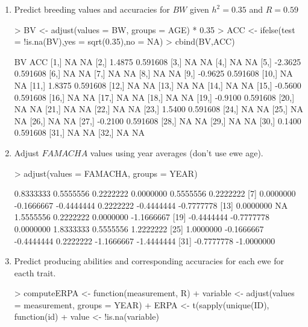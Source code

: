 \documentclass[12pt,a4paper]{paper}
\begin{document}
\begin{enumerate}
\item Predict breeding values and accuracies for $BW$ given $h^{2} = 0.35$ and $R = 0.59$
\begin{Schunk}
\begin{Sinput}
> BV <- adjust(values = BW, groups = AGE) * 0.35
> ACC <- ifelse(test = !is.na(BV),yes = sqrt(0.35),no = NA)
> cbind(BV,ACC)
\end{Sinput}
\begin{Soutput}
           BV      ACC
 [1,]      NA       NA
 [2,]  1.4875 0.591608
 [3,]      NA       NA
 [4,]      NA       NA
 [5,] -2.3625 0.591608
 [6,]      NA       NA
 [7,]      NA       NA
 [8,]      NA       NA
 [9,] -0.9625 0.591608
[10,]      NA       NA
[11,]  1.8375 0.591608
[12,]      NA       NA
[13,]      NA       NA
[14,]      NA       NA
[15,] -0.5600 0.591608
[16,]      NA       NA
[17,]      NA       NA
[18,]      NA       NA
[19,] -0.9100 0.591608
[20,]      NA       NA
[21,]      NA       NA
[22,]      NA       NA
[23,]  1.5400 0.591608
[24,]      NA       NA
[25,]      NA       NA
[26,]      NA       NA
[27,] -0.2100 0.591608
[28,]      NA       NA
[29,]      NA       NA
[30,]  0.1400 0.591608
[31,]      NA       NA
[32,]      NA       NA
\end{Soutput}
\end{Schunk}
\item Adjust $FAMACHA$ values using year averages (don't use ewe age). 
\begin{Schunk}
\begin{Sinput}
> adjust(values = FAMACHA, groups = YEAR)
\end{Sinput}
\begin{Soutput}
 [1]  0.8333333  0.5555556  0.2222222  0.0000000  0.5555556  0.2222222
 [7]  0.0000000 -0.1666667 -0.4444444  0.2222222 -0.4444444 -0.7777778
[13]  0.0000000         NA  1.5555556  0.2222222  0.0000000 -1.1666667
[19] -0.4444444 -0.7777778  0.0000000  1.8333333  0.5555556  1.2222222
[25]  1.0000000 -0.1666667 -0.4444444  0.2222222 -1.1666667 -1.4444444
[31] -0.7777778 -1.0000000
\end{Soutput}
\end{Schunk}
\item Predict producing abilities and corresponding accuracies for each ewe for eacth trait.
\begin{Schunk}
\begin{Sinput}
> computeERPA <- function(measurement, R) {
+   variable <- adjust(values = measurement, groups = YEAR)
+   ERPA <- t(sapply(unique(ID), function(id) {
+     value <- !is.na(variable)
}}
\end{Sinput}
\end{Schunk}
\end{enumerate}
\end{document}
